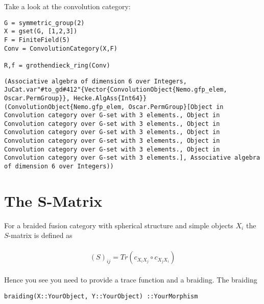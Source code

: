 \documentclass{memoir}
\begin{document}
Take a look at the convolution category:






\begin{verbatim}
G = symmetric_group(2)
X = gset(G, [1,2,3])
F = FiniteField(5)
Conv = ConvolutionCategory(X,F)

R,f = grothendieck_ring(Conv)
\end{verbatim}


\begin{lstlisting}
(Associative algebra of dimension 6 over Integers, JuCat.var"#to_gd#412"{Vector{ConvolutionObject{Nemo.gfp_elem, Oscar.PermGroup}}, Hecke.AlgAss{Int64}}(ConvolutionObject{Nemo.gfp_elem, Oscar.PermGroup}[Object in Convolution category over G-set with 3 elements., Object in Convolution category over G-set with 3 elements., Object in Convolution category over G-set with 3 elements., Object in Convolution category over G-set with 3 elements., Object in Convolution category over G-set with 3 elements., Object in Convolution category over G-set with 3 elements.], Associative algebra of dimension 6 over Integers))
\end{lstlisting}



\hypertarget{7504109423507221637}{}


\chapter{The S-Matrix}



For a braided fusion category with spherical structure and simple objects \(X_i\) the \(S\)-matrix is defined as



\begin{equation*}
\begin{split}\begin{aligned}
(S)_{ij} = Tr(c_{X_iX_j} \circ c_{X_jX_i})
\end{aligned}\end{split}\end{equation*}


Hence you see you need to provide a trace function and a braiding. The braiding




\begin{lstlisting}
braiding(X::YourObject, Y::YourObject) ::YourMorphism
\end{lstlisting}
\end{document}
